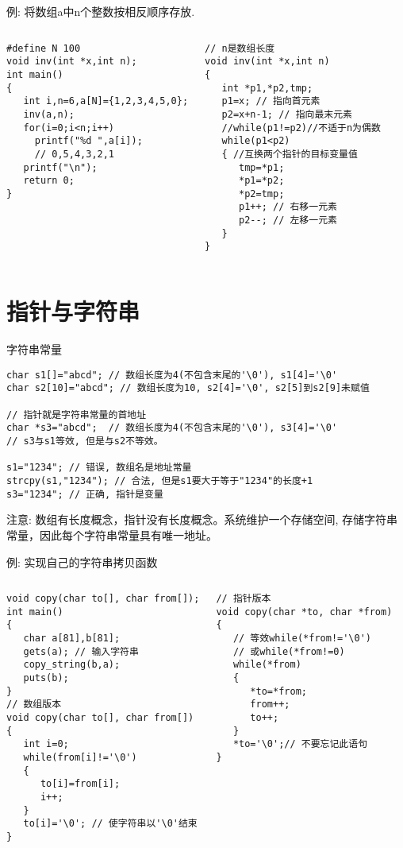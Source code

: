 \begin{frame}{例: 将数组a中n个整数按相反顺序存放. }
\begin{columns}[T]
\begin{lstlisting}
#define N 100
void inv(int *x,int n);
int main()
{
   int i,n=6,a[N]={1,2,3,4,5,0};
   inv(a,n);
   for(i=0;i<n;i++) 
     printf("%d ",a[i]); 
     // 0,5,4,3,2,1
   printf("\n");
   return 0;
}
\end{lstlisting}
\begin{lstlisting}
// n是数组长度
void inv(int *x,int n)
{
   int *p1,*p2,tmp;
   p1=x; // 指向首元素
   p2=x+n-1; // 指向最末元素
   //while(p1!=p2)//不适于n为偶数
   while(p1<p2)
   { //互换两个指针的目标变量值
      tmp=*p1;
      *p1=*p2;
      *p2=tmp;
      p1++; // 右移一元素
      p2--; // 左移一元素
   }
}
\end{lstlisting}
\end{columns}
\medskip
\end{frame}

\section{指针与字符串}

\begin{frame}{字符串常量}
\begin{lstlisting}
char s1[]="abcd"; // 数组长度为4(不包含末尾的'\0'), s1[4]='\0' 
char s2[10]="abcd"; // 数组长度为10, s2[4]='\0', s2[5]到s2[9]未赋值

// 指针就是字符串常量的首地址
char *s3="abcd";  // 数组长度为4(不包含末尾的'\0'), s3[4]='\0' 
// s3与s1等效, 但是与s2不等效。 

s1="1234"; // 错误, 数组名是地址常量
strcpy(s1,"1234"); // 合法, 但是s1要大于等于"1234"的长度+1
s3="1234"; // 正确, 指针是变量
\end{lstlisting}
\begin{block}{注意: }
	数组有长度概念，指针没有长度概念。系统维护一个存储空间, 存储字符串常量，因此每个字符串常量具有唯一地址。
\end{block}
\end{frame}

\begin{frame}{例: 实现自己的字符串拷贝函数}
\begin{columns}[T]
\begin{lstlisting}
void copy(char to[], char from[]);
int main()
{
   char a[81],b[81];
   gets(a); // 输入字符串
   copy_string(b,a);
   puts(b);
}
// 数组版本
void copy(char to[], char from[])
{
   int i=0;
   while(from[i]!='\0')
   {
      to[i]=from[i];
      i++;
   }
   to[i]='\0'; // 使字符串以'\0'结束
}
\end{lstlisting}
\begin{lstlisting}
// 指针版本
void copy(char *to, char *from)
{
   // 等效while(*from!='\0')
   // 或while(*from!=0)
   while(*from) 
   {
      *to=*from;
      from++;
      to++;
   }
   *to='\0';// 不要忘记此语句
}
\end{lstlisting}
\end{columns}
\medskip
\end{frame}

